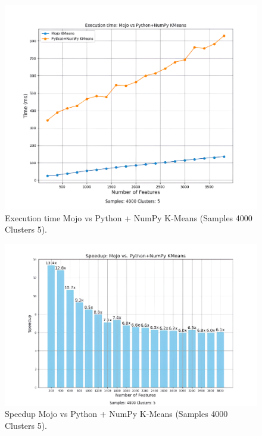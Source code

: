 \documentclass[conference]{IEEEtran}
\begin{document}
\begin{figure}[h]
    \centerline{\includegraphics[width=\linewidth]{fig3.png}}
    \caption{Execution time   Mojo vs Python + NumPy K-Means (Samples 4000 Clusters 5).}
    \label{fig3}
\end{figure}

\begin{figure}[h]
    \centerline{\includegraphics[width=\linewidth]{fig4.png}}
    \caption{Speedup   Mojo vs Python + NumPy K-Means (Samples 4000 Clusters 5).}
    \label{fig4}
\end{figure}
\end{document}
